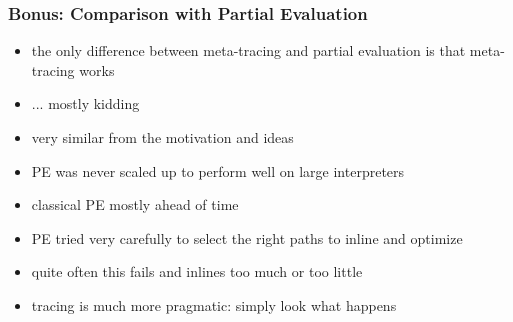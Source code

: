 \documentclass[utf8x]{beamer}
\begin{document}
\begin{frame}
  \frametitle{Bonus: Comparison with Partial Evaluation}
  \begin{itemize}
      \pause
      \item the only difference between meta-tracing and partial evaluation is that meta-tracing works
      \pause
      \item ... mostly kidding
      \pause
      \item very similar from the motivation and ideas
      \item PE was never scaled up to perform well on large interpreters
      \item classical PE mostly ahead of time
      \item PE tried very carefully to select the right paths to inline and optimize
      \item quite often this fails and inlines too much or too little
      \item tracing is much more pragmatic: simply look what happens
  \end{itemize}
\end{frame}
\end{document}
